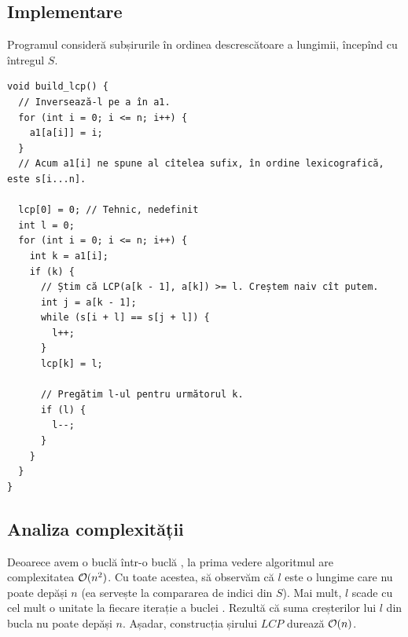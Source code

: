 \documentclass[../main.tex]{subfiles}
\begin{document}
\subsection{Implementare}

Programul consideră subșirurile în ordinea descrescătoare a lungimii, începînd cu întregul $S$.

\begin{verbatim}
void build_lcp() {
  // Inversează-l pe a în a1.
  for (int i = 0; i <= n; i++) {
    a1[a[i]] = i;
  }
  // Acum a1[i] ne spune al cîtelea sufix, în ordine lexicografică, este s[i...n].

  lcp[0] = 0; // Tehnic, nedefinit
  int l = 0;
  for (int i = 0; i <= n; i++) {
    int k = a1[i];
    if (k) {
      // Știm că LCP(a[k - 1], a[k]) >= l. Creștem naiv cît putem.
      int j = a[k - 1];
      while (s[i + l] == s[j + l]) {
        l++;
      }
      lcp[k] = l;

      // Pregătim l-ul pentru următorul k.
      if (l) {
        l--;
      }
    }
  }
}
\end{verbatim}

\subsection{Analiza complexității}

Deoarece avem o buclă  într-o buclă , la prima vedere algoritmul are complexitatea $\mathcal{O}(n^2)$. Cu toate acestea, să observăm că $l$ este o lungime care nu poate depăși $n$ (ea servește la compararea de indici din $S$). Mai mult, $l$ scade cu cel mult o unitate la fiecare iterație a buclei . Rezultă că suma creșterilor lui $l$ din bucla  nu poate depăși $n$. Așadar, construcția șirului $LCP$ durează $\mathcal{O}(n)$.
\end{document}
